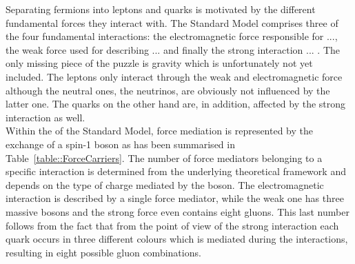 Separating fermions into leptons and quarks is motivated by the different fundamental forces they interact with.
The Standard Model comprises three of the four fundamental interactions: the electromagnetic force responsible for ..., the weak force used for describing ... and finally the strong interaction ... .
The only missing piece of the puzzle is gravity which is unfortunately not yet included.
The leptons only interact through the weak and electromagnetic force although the neutral ones, the neutrinos, are obviously not influenced by the latter one. The quarks on the other hand are, in addition, affected by the strong interaction as well.
\\
Within the of the Standard Model, force mediation is represented by the exchange of a spin-1 boson as has been summarised in Table~\ref{table::ForceCarriers}.
The number of force mediators belonging to a specific interaction is determined from the underlying theoretical framework and depends on the type of charge mediated by the boson. The electromagnetic interaction is described by a single force mediator, while the weak one has three massive bosons and the strong force even contains eight gluons.
This last number follows from the fact that from the point of view of the strong interaction each quark occurs in three different colours which is mediated during the interactions, resulting in eight possible gluon combinations.
\\
